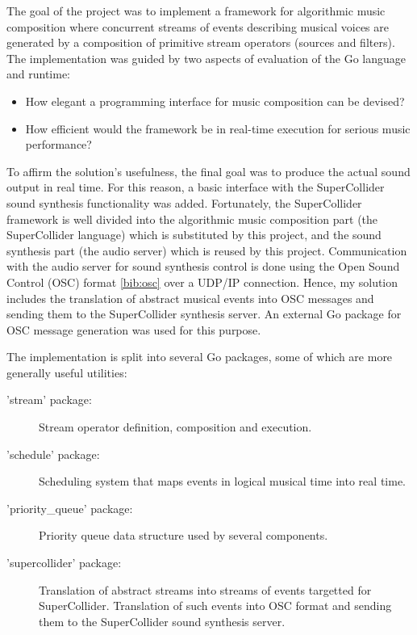 \documentclass {article}
\begin{document}
The goal of the project was to implement a framework for algorithmic music composition where concurrent streams of events describing musical voices are generated by a composition of primitive stream operators (sources and filters). The implementation was guided by two aspects of evaluation of the Go language and runtime:

\begin{itemize}
\item How elegant a programming interface for music composition can be devised?
\item How efficient would the framework be in real-time execution for serious music performance?
\end{itemize}

To affirm the solution's usefulness, the final goal was to produce the actual sound output in real time. For this reason, a basic interface with the SuperCollider sound synthesis functionality was added. Fortunately, the SuperCollider framework is well divided into the algorithmic music composition part (the SuperCollider language) which is substituted by this project, and the sound synthesis part (the audio server) which is reused by this project. Communication with the audio server for sound synthesis control is done using the Open Sound Control (OSC) format \ref{bib:osc} over a UDP/IP connection. Hence, my solution includes the translation of abstract musical events into OSC messages and sending them to the SuperCollider synthesis server. An external Go package for OSC message generation was used for this purpose.

The implementation is split into several Go packages, some of which are more generally useful utilities:

\begin{description}
\item['stream' package:] Stream operator definition, composition and execution.
\item['schedule' package:] Scheduling system that maps events in logical musical time into real time.
\item['priority\_queue' package:] Priority queue data structure used by several components.
\item['supercollider' package:] Translation of abstract streams into streams of events targetted for SuperCollider. Translation of such events into OSC format and sending them to the SuperCollider sound synthesis server.
\end{description}
\end{document}

